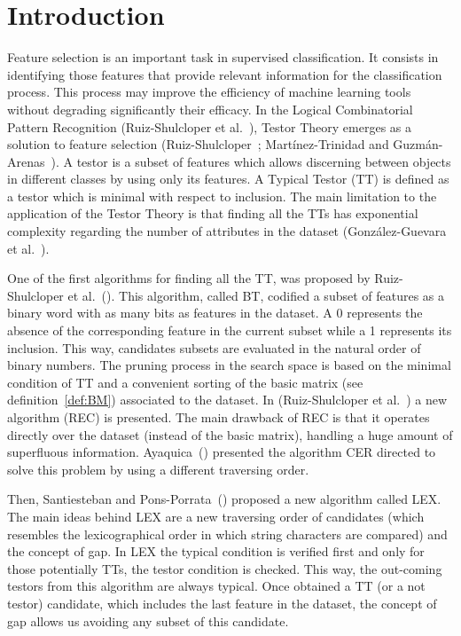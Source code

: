 \documentclass[citeauthoryear]{llncs}
\begin{document}
\section{Introduction}
%
	Feature selection is an important task in supervised classification. It consists in identifying those features that provide relevant information for the classification process. This process may improve the efficiency of machine learning tools without degrading significantly their efficacy.
	In the Logical Combinatorial Pattern Recognition (Ruiz-Shulcloper et al.~\cite{Shulcloper1995}), Testor Theory emerges as a solution to feature selection (Ruiz-Shulcloper~\cite{Shulcloper2008};	Mart\'inez-Trinidad and	Guzm\'an-Arenas~\cite{Martinez2001}). A testor is a subset of features which allows discerning between objects in different classes by using only its features. A Typical Testor (TT) is defined as a testor which is minimal with respect to inclusion. The main limitation to the application of the Testor Theory is that finding all the TTs has exponential complexity regarding the number of attributes in the dataset (González-Guevara et al.~\cite{Gonzalez15}).
	
	One of the first algorithms for finding all the TT, was proposed by Ruiz-Shulcloper et al.~(\cite{Shulcloper1985}). This algorithm, called BT, codified a subset of features as a binary word with as many bits as features in the dataset. A 0 represents the absence of the corresponding feature in the current	subset while a 1 represents its inclusion. This way, candidates subsets are evaluated in the natural order of binary numbers. The pruning process in the	search space is based on the minimal condition of TT and a convenient sorting of the basic matrix (see definition~\ref{def:BM}) associated to the dataset. In (Ruiz-Shulcloper et al.~\cite{Shulcloper1995b}) a new algorithm (REC) is presented.	The main drawback of REC is that it operates directly over the dataset (instead of the	basic matrix), handling a huge amount of superfluous information. Ayaquica~(\cite{Ayaquica1997})	presented the algorithm CER directed to solve this problem by using a different traversing	order. 
	
	Then, Santiesteban and Pons-Porrata~(\cite{Santiesteban2003}) proposed a new algorithm called LEX. The main ideas behind LEX are a new traversing order of candidates (which resembles the	lexicographical order in which string characters are compared) and the concept of gap. In LEX the typical condition is verified first and only for those potentially TTs, the testor condition is checked. This way, the out-coming testors from this algorithm are always typical. Once obtained a TT (or a not testor) candidate, which includes the last feature in the dataset, the concept of gap allows us avoiding any subset of this candidate.
	
\end{document}
